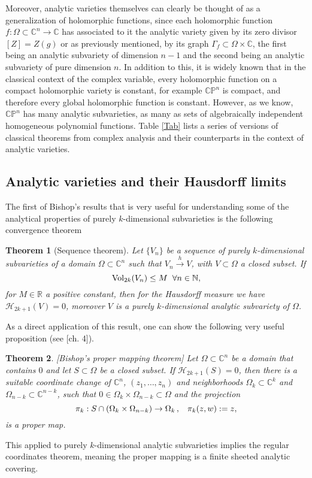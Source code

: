 \documentclass[12pt,twoside,a4paper]{report}
\newtheorem{theorem}{Theorem}[section]
\newcommand{\nat}{\ensuremath{ \mathbb N }}
\newcommand{\co}{\ensuremath{\mathbb C }}
\newcommand{\con}{\ensuremath{\mathbb{C}^n}}
\newcommand{\cp}{\ensuremath{\mathbb{CP}}}
\newcommand{\re}{\ensuremath{\mathbb R }}
\begin{document}
Moreover, analytic varieties themselves can clearly be thought of as a generalization of holomorphic functions,
since each holomorphic function $f:\Omega\subset\con\rightarrow\co$ has associated to it the analytic variety given by its zero divisor $[Z]=Z(g)$
or as previously mentioned, by its graph $\Gamma_{f}\subset\Omega\times\co$, the first being an analytic subvariety of
dimension $n-1$ and the second being
an analytic subvariety of pure dimension $n$. In addition to this, it is widely known that in the classical context
of the complex variable, every holomorphic function on a compact holomorphic variety is constant, for example $\cp^n$ is compact,
and therefore every global holomorphic function is constant. However, as we know, $\cp^n$ has many analytic subvarieties, as many
as sets of algebraically independent homogeneous polynomial functions. Table \ref{Tab} lists a series of
versions of classical theorems from complex analysis and their counterparts in the context of analytic varieties.




\subsection{Analytic varieties and their Hausdorff limits}
The first of Bishop's results that is very useful for understanding some of the analytical properties of purely $k$-dimensional subvarieties is the following convergence theorem
\begin{theorem}[Sequence theorem] \label{bishop sequence}
  Let $\lbrace
        V_n\rbrace$ be a sequence of purely $k$-dimensional subvarieties of a
        domain $\Omega\subset\con$ such that $V_n\overset{h}\rightarrow V$, with
        $V\subset\Omega$ a closed subset. If $$ \textrm{Vol}_{2k}(V_n)\leq M
        \hspace*{0.2cm}\forall n\in\nat, $$
        \noindent for $M\in\re$ a positive constant, then for the Hausdorff
        measure we have $\mathcal{H}_{2k+1}(V)=0$, moreover $V$ is a purely
        $k$-dimensional analytic subvariety of $\Omega$.
\end{theorem}
As a direct application of this result, one can show the following very useful proposition (see \cite{Stolzenberg}[ch. 4]).
\begin{theorem}\label{bishop mapping}[Bishop's proper mapping theorem] Let
        $\Omega\subset\con$ be a domain that contains $0$ and let
        $S\subset\Omega$ be a closed subset. If $\mathcal{H}_{2k+1}(S)=0$, then there
        is a suitable coordinate change of $\con$, $(z_1,\ldots,z_n)$ and
        neighborhoods $\Omega_k\subset\co^k$ and $\Omega_{n-k}\subset\co^{n-k}$, such that
        $0\in\Omega_k\times\Omega_{n-k}\subset\Omega$ and the projection
        \[
          \pi_k:S\cap(\Omega_k\times\Omega_{n-k})\rightarrow\Omega_k\, ,\hspace{0.3cm}\pi_k(z,w):=z,
        \]
        \noindent is a proper map.
\end{theorem}
\noindent This applied to purely $k$-dimensional analytic
subvarieties implies the regular coordinates theorem, meaning the proper
mapping is a finite sheeted analytic covering.
\end{document}
